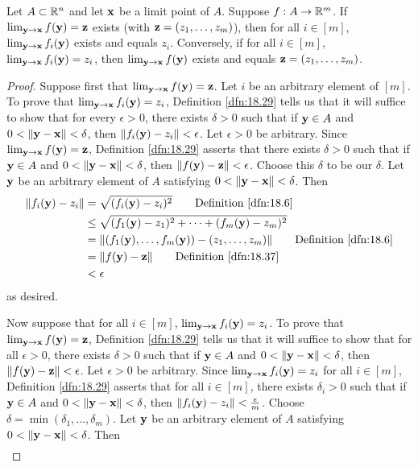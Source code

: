 \documentclass[../main.tex]{subfiles}
\begin{document}
\begin{theorem}\label{trm:18.38}
    Let $A\subset\mathbb{R}^n$ and let $\mathbf{x}$ be a limit point of $A$. Suppose $f:A\to\mathbb{R}^m$. If $\lim_{\mathbf{y}\to\mathbf{x}}f(\mathbf{y})=\mathbf{z}$ exists (with $\mathbf{z}=(z_1,\dots,z_m)$), then for all $i\in[m]$, $\lim_{\mathbf{y}\to\mathbf{x}}f_i(\mathbf{y})$ exists and equals $z_i$. Conversely, if for all $i\in[m]$, $\lim_{\mathbf{y}\to\mathbf{x}}f_i(\mathbf{y})=z_i$, then $\lim_{\mathbf{y}\to\mathbf{x}}f(\mathbf{y})$ exists and equals $\mathbf{z}=(z_1,\dots,z_m)$.
    \begin{proof}
        Suppose first that $\lim_{\mathbf{y}\to\mathbf{x}}f(\mathbf{y})=\mathbf{z}$. Let $i$ be an arbitrary element of $[m]$. To prove that $\lim_{\mathbf{y}\to\mathbf{x}}f_i(\mathbf{y})=z_i$, Definition \ref{dfn:18.29} tells us that it will suffice to show that for every $\epsilon>0$, there exists $\delta>0$ such that if $\mathbf{y}\in A$ and $0<\norm{\mathbf{y}-\mathbf{x}}<\delta$, then $\norm{f_i(\mathbf{y})-z_i}<\epsilon$. Let $\epsilon>0$ be arbitrary. Since $\lim_{\mathbf{y}\to\mathbf{x}}f(\mathbf{y})=\mathbf{z}$, Definition \ref{dfn:18.29} asserts that there exists $\delta>0$ such that if $\mathbf{y}\in A$ and $0<\norm{\mathbf{y}-\mathbf{x}}<\delta$, then $\norm{f(\mathbf{y})-\mathbf{z}}<\epsilon$. Choose this $\delta$ to be our $\delta$. Let $\mathbf{y}$ be an arbitrary element of $A$ satisfying $0<\norm{\mathbf{y}-\mathbf{x}}<\delta$. Then
        \begin{align*}
            \norm{f_i(\y)-z_i} &= \sqrt{(f_i(\y)-z_i)^2}\tag*{Definition \ref{dfn:18.6}}\\
            &\leq \sqrt{(f_1(\y)-z_1)^2+\cdots+(f_m(\y)-z_m)^2}\\
            &= \norm{(f_1(\y),\dots,f_m(\y))-(z_1,\dots,z_m)}\tag*{Definition \ref{dfn:18.6}}\\
            &= \norm{f(\y)-\z}\tag*{Definition \ref{dfn:18.37}}\\
            &< \epsilon
        \end{align*}
        as desired.\par
        Now suppose that for all $i\in[m]$, $\lim_{\mathbf{y}\to\mathbf{x}}f_i(\mathbf{y})=z_i$. To prove that $\lim_{\mathbf{y}\to\mathbf{x}}f(\mathbf{y})=\mathbf{z}$, Definition \ref{dfn:18.29} tells us that it will suffice to show that for all $\epsilon>0$, there exists $\delta>0$ such that if $\mathbf{y}\in A$ and $0<\norm{\mathbf{y}-\mathbf{x}}<\delta$, then $\norm{f(\mathbf{y})-\mathbf{z}}<\epsilon$. Let $\epsilon>0$ be arbitrary. Since $\lim_{\mathbf{y}\to\mathbf{x}}f_i(\mathbf{y})=z_i$ for all $i\in[m]$, Definition \ref{dfn:18.29} asserts that for all $i\in[m]$, there exists $\delta_i>0$ such that if $\mathbf{y}\in A$ and $0<\norm{\mathbf{y}-\mathbf{x}}<\delta$, then $\norm{f_i(\mathbf{y})-z_i}<\frac{\epsilon}{m}$. Choose $\delta=\min(\delta_1,\dots,\delta_m)$. Let $\mathbf{y}$ be an arbitrary element of $A$ satisfying $0<\norm{\mathbf{y}-\mathbf{x}}<\delta$. Then
        \begin{align*}

\end{align*}
\end{proof}
\end{theorem}
\end{document}
